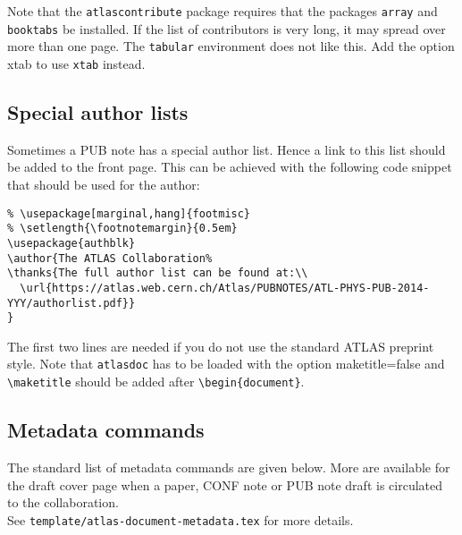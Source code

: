 \documentclass[atlasstyle,UKenglish]{latex/atlasdoc}
\newcommand{\Macro}[1]{\texttt{\textbackslash #1}\xspace}
\newcommand{\Option}[1]{\textsf{#1}\xspace}
\newcommand{\Package}[1]{\texttt{#1}\xspace}
\begin{document}
Note that the \Package{atlascontribute} package requires that the packages 
\Package{array} and \Package{booktabs} be installed.
If the list of contributors is very long, it may spread over more than one page.
The \Package{tabular} environment does not like this.
Add the option \Option{xtab} to use \Package{xtab} instead.


\subsection{Special author lists}

Sometimes a PUB note has a special author list.
Hence a link to this list should be added to the front page.
This can be achieved with the following code snippet that should be used for the author:
\begin{verbatim}
% \usepackage[marginal,hang]{footmisc}
% \setlength{\footnotemargin}{0.5em}
\usepackage{authblk}
\author{The ATLAS Collaboration%
\thanks{The full author list can be found at:\\
  \url{https://atlas.web.cern.ch/Atlas/PUBNOTES/ATL-PHYS-PUB-2014-YYY/authorlist.pdf}}
}
\end{verbatim}

The first two lines are needed if you do not use the standard ATLAS preprint style.
Note that \Package{atlasdoc} has to be loaded with the option \Option{maketitle=false}
and \Macro{maketitle} should be added after \verb|\begin{document}|.


\subsection{Metadata commands}

The standard list of metadata commands are given below.
More are available for the draft cover page when a paper, CONF note or PUB note draft
is circulated to the collaboration.\\
See \texttt{template/atlas-document-metadata.tex} for more details.
\end{document}
